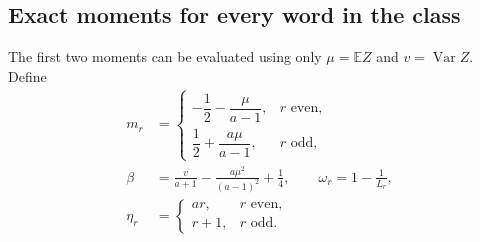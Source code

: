 \documentclass[11pt]{article}
\numberwithin{equation}{section}
\theoremstyle{definition}
\theoremstyle{remark}
\newcommand{\E}{\mathbb E}
\newcommand{\Var}{\operatorname{Var}}
\begin{document}
\subsection{Exact moments for every word in the class}

The first two moments can be evaluated using only $\mu=\E Z$ and
$v=\Var Z$. Define
\begin{align}
 m_r&=
 \begin{cases}
 -\dfrac12-\dfrac{\mu}{a-1},&r\text{ even},\\[2mm]
 \dfrac12+\dfrac{a\mu}{a-1},&r\text{ odd},
 \end{cases}\label{bmf:eq:parity-mean}\\
 \beta&=\frac{v}{a+1}-\frac{a\mu^2}{(a-1)^2}+\frac14,
 \qquad
 \omega_r=1-\frac1{L_r},\label{bmf:eq:beta}\\
 \eta_r&=
 \begin{cases}ar,&r\text{ even},\\r+1,&r\text{ odd}.
 \end{cases}\label{bmf:eq:eta}
\end{align}
\end{document}

